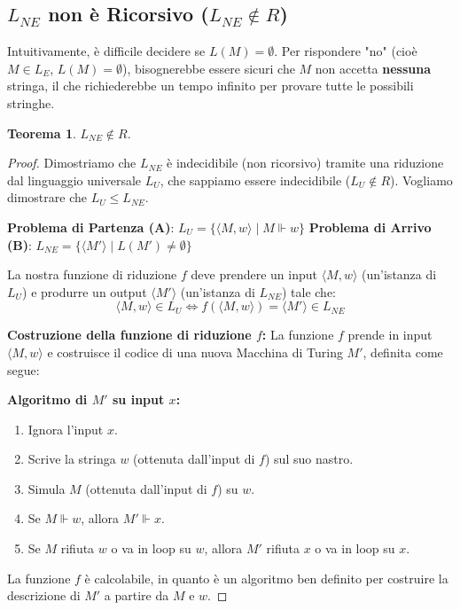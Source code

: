 \documentclass[a4paper]{article}
\theoremstyle{definition} %
\newtheorem{theorem}{Teorema}
[section] %
\begin{document}
\subsection{$L_{NE}$ non è Ricorsivo ($L_{NE} \notin R$)}

Intuitivamente, è difficile decidere se $L(M) = \emptyset$. Per rispondere "no" (cioè $M \in L_E$, $L(M) = \emptyset$), bisognerebbe essere sicuri che $M$ non accetta \textbf{nessuna} stringa, il che richiederebbe un tempo infinito per provare tutte le possibili stringhe.

\begin{theorem}
$L_{NE} \notin R$.
\end{theorem}
\begin{proof}
Dimostriamo che $L_{NE}$ è indecidibile (non ricorsivo) tramite una riduzione dal linguaggio universale $L_U$, che sappiamo essere indecidibile ($L_U \notin R$).
Vogliamo dimostrare che $L_U \le L_{NE}$.

\textbf{Problema di Partenza (A)}: $L_U = \{ \langle M, w \rangle \mid M \Vdash w \}$
\textbf{Problema di Arrivo (B)}: $L_{NE} = \{ \langle M' \rangle \mid L(M') \neq \emptyset \}$

La nostra funzione di riduzione $f$ deve prendere un input $\langle M, w \rangle$ (un'istanza di $L_U$) e produrre un output $\langle M' \rangle$ (un'istanza di $L_{NE}$) tale che:
\[
\langle M, w \rangle \in L_U \iff f(\langle M, w \rangle) = \langle M' \rangle \in L_{NE}
\]

\textbf{Costruzione della funzione di riduzione $f$:}
La funzione $f$ prende in input $\langle M, w \rangle$ e costruisce il codice di una nuova Macchina di Turing $M'$, definita come segue:

\textbf{Algoritmo di $M'$ su input $x$:}
\begin{enumerate}
    \item Ignora l'input $x$.
    \item Scrive la stringa $w$ (ottenuta dall'input di $f$) sul suo nastro.
    \item Simula $M$ (ottenuta dall'input di $f$) su $w$.
    \item Se $M \Vdash w$, allora $M' \Vdash x$.
    \item Se $M$ rifiuta $w$ o va in loop su $w$, allora $M'$ rifiuta $x$ o va in loop su $x$.
\end{enumerate}

La funzione $f$ è calcolabile, in quanto è un algoritmo ben definito per costruire la descrizione di $M'$ a partire da $M$ e $w$.


\end{proof}
\end{document}
